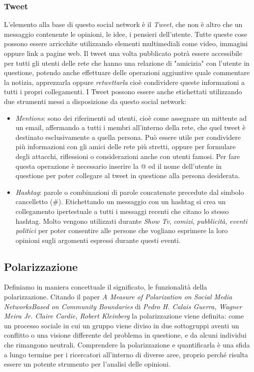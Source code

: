 \subsubsection{Tweet}
L'elemento alla base di questo social network è il \textit{Tweet}, che non è altro che un messaggio contenente le opinioni, le idee, i pensieri dell'utente. Tutte queste cose possono essere arricchite utilizzando elementi multimediali come video, immagini oppure link a pagine web. Il tweet una volta pubblicato potrà essere accessibile per tutti gli utenti delle rete che hanno una relazione di "amicizia" con l'utente in questione, potendo anche effettuare delle operazioni aggiuntive quale commentare la notizia, apprezzarla oppure \textit{retwettarla} cioè condividere queste informazioni a tutti i propri collegamenti.
I Tweet possono essere anche etichettati utilizzando due strumenti messi a disposizione da questo social network:
\begin{itemize}
\item \textit{Mentions}: sono dei riferimenti ad utenti, cioè come assegnare un mittente ad un email, affermando a tutti i membri all'interno della rete, che quel tweet è destinato esclusivamente a quella persona. Può essere utile per condividere più informazioni con gli amici delle rete più stretti, oppure per formulare degli attacchi, riflessioni o considerazioni anche con utenti famosi. Per fare questa operazione è necessario inserire la @ ed il nome dell'utente in questione per poter collegare al tweet in questione alla persona desiderata.
\item \textit{Hashtag}: parole o combinazioni di parole concatenate precedute dal simbolo cancelletto (\#).
Etichettando un messaggio con un hashtag si crea un collegamento ipertestuale a tutti i messaggi recenti che citano lo stesso hashtag. Molto  vengono utilizzati durante \textit{Show Tv}, \textit{comizi}, \textit{pubblicità}, \textit{eventi politici} per poter consentire alle persone che vogliano esprimere la loro opinioni sugli argomenti espressi durante questi eventi. 

\end{itemize}

\subsection{Polarizzazione}
Definiamo in maniera concettuale il significato, le funzionalità della polarizzazione. 
Citando il paper \textit{A Measure of Polarization on Social Media NetworksBased on Community Boundaries} di \textit{Pedro H. Calais Guerra, Wagner Meira Jr. Claire Cardie, Robert Kleinberg}\cite{Guerra2015polarization} la polarizzazione viene definita: come un processo sociale in cui un gruppo viene diviso in due sottogruppi aventi un conflitto o una visione differente del problema in questione, e da alcuni individui che rimangono neutrali.
Comprendere la polarizzazione e quantificarla è una sfida a lungo termine per i ricercatori all'interno di diverse aree, proprio perché risulta essere un potente strumento per l'analisi delle opinioni.

